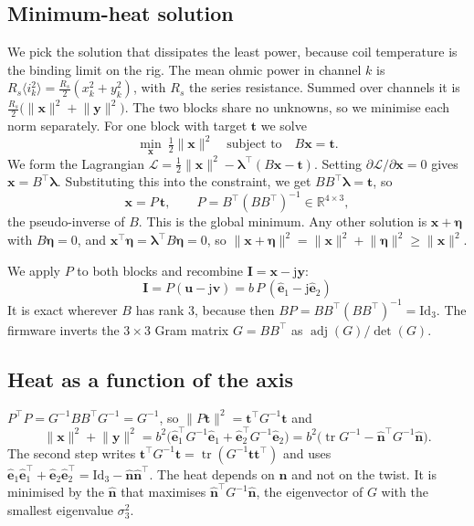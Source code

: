 \documentclass[11pt]{article}
\newcommand{\R}{\mathbb{R}}
\newcommand{\vb}[1]{\mathbf{#1}}
\newcommand{\uv}[1]{\hat{\mathbf{#1}}}
\newcommand{\jj}{\mathrm{j}}
\newcommand{\Id}{\mathrm{Id}}
\begin{document}
\subsection{Minimum-heat solution}
We pick the solution that dissipates the least power, because coil temperature is the binding
limit on the rig. The mean ohmic power in channel $k$ is
$R_s\langle i_k^2\rangle = \tfrac{R_s}{2}(x_k^2+y_k^2)$, with $R_s$ the series resistance. Summed
over channels it is $\tfrac{R_s}{2}\big(\lVert\vb x\rVert^2+\lVert\vb y\rVert^2\big)$. The two
blocks share no unknowns, so we minimise each norm separately. For one block with target $\vb t$
we solve
\begin{equation}
  \min_{\vb x}\ \tfrac12\lVert\vb x\rVert^2\quad\text{subject to}\quad B\vb x=\vb t .
\end{equation}
We form the Lagrangian $\mathcal L = \tfrac12\lVert\vb x\rVert^2 - \bm\lambda^\top(B\vb x-\vb t)$.
Setting $\partial\mathcal L/\partial\vb x = 0$ gives $\vb x = B^\top\bm\lambda$. Substituting this
into the constraint, we get $BB^\top\bm\lambda = \vb t$, so
\begin{equation}
  \vb x = P\,\vb t,\qquad P = B^\top(BB^\top)^{-1}\in\R^{4\times3},
\end{equation}
the pseudo-inverse of $B$. This is the global minimum. Any other solution is $\vb x+\bm\eta$ with
$B\bm\eta = 0$, and $\vb x^\top\bm\eta = \bm\lambda^\top B\bm\eta = 0$, so
$\lVert\vb x+\bm\eta\rVert^2 = \lVert\vb x\rVert^2 + \lVert\bm\eta\rVert^2 \ge \lVert\vb x\rVert^2$.

We apply $P$ to both blocks and recombine $\vb I = \vb x - \jj\vb y$:
\begin{equation}
  \boxed{\ \vb I = P(\vb u - \jj\vb v) = b\,P\,(\uv e_1 - \jj\uv e_2)\ }
\end{equation}
It is exact wherever $B$ has rank 3, because then $BP = BB^\top(BB^\top)^{-1} = \Id_3$. The
firmware inverts the $3\times3$ Gram matrix $G = BB^\top$ as $\operatorname{adj}(G)/\det(G)$.

\subsection{Heat as a function of the axis}
$P^\top P = G^{-1}BB^\top G^{-1} = G^{-1}$, so $\lVert P\vb t\rVert^2 = \vb t^\top G^{-1}\vb t$ and
\begin{equation}
  \lVert\vb x\rVert^2 + \lVert\vb y\rVert^2
  = b^2\big(\uv e_1^\top G^{-1}\uv e_1 + \uv e_2^\top G^{-1}\uv e_2\big)
  = b^2\big(\operatorname{tr}G^{-1} - \uv n^\top G^{-1}\uv n\big).
\end{equation}
The second step writes $\vb t^\top G^{-1}\vb t = \operatorname{tr}(G^{-1}\vb t\vb t^\top)$ and uses
$\uv e_1\uv e_1^\top + \uv e_2\uv e_2^\top = \Id_3 - \uv n\uv n^\top$. The heat depends on $\uv n$
and not on the twist. It is minimised by the $\uv n$ that maximises $\uv n^\top G^{-1}\uv n$,
the eigenvector of $G$ with the smallest eigenvalue $\sigma_3^2$.
\end{document}
